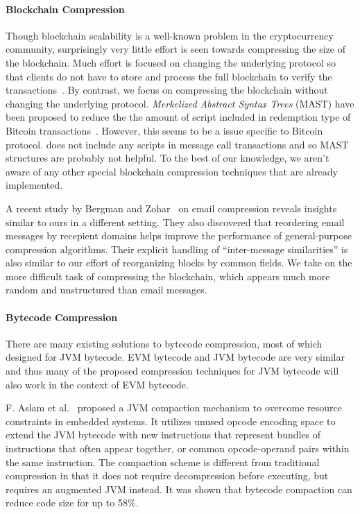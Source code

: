 \paragraph{Blockchain Compression}
Though blockchain scalability is a well-known problem in the cryptocurrency community,
surprisingly very little effort is seen towards compressing the size of the blockchain.
Much effort is focused on changing the underlying protocol so that clients
do not have to store and process the full blockchain to verify the transactions~\cite{lightclient, ultimate}.
By contrast, we focus on compressing the blockchain without changing the underlying protocol.
\emph{Merkelized Abstract Syntax Trees} (MAST) have been proposed to reduce the the amount of script included in redemption
type of Bitcoin transactions~\cite{mast}. 
However, this seems to be a issue specific to Bitcoin protocol.  
\eth{} does not include any scripts in message call transactions and so  MAST structures are probably not helpful.
To the best of our knowledge, we aren't aware of any other special blockchain compression techniques that are already implemented. 

A recent study by Bergman and Zohar~\cite{bergman2015compressing} on email compression
reveals insights similar to ours in a different setting.
They also discovered that reordering email messages by recepient domains helps improve
the performance of general-purpose compression algorithms.
Their explicit handling of ``inter-message similarities'' is also similar to our effort of reorganizing blocks by common fields.
We take on the more difficult task of compressing the \eth{} blockchain,
which appears much more random and unstructured than email messages.

\paragraph{Bytecode Compression}
There are many existing solutions to bytecode compression, most of which designed for JVM bytecode.
EVM bytecode and JVM bytecode are very similar and thus many of the proposed compression techniques for JVM bytecode
will also work in the context of EVM bytecode.

F. Aslam et al.~\cite{aslam2010} proposed a JVM compaction mechanism to overcome resource constraints in embedded systems.
It utilizes unused opcode encoding space to extend the JVM bytecode with new instructions that represent bundles of
instructions that often appear together, or common opcode-operand pairs within the same instruction.
The compaction scheme is different from traditional compression in that it does not require decompression before executing,
but requires an augmented JVM instead. It was shown that bytecode compaction can reduce code size for up to 58\%.

